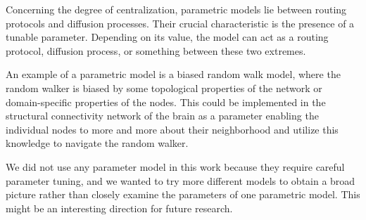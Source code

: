 Concerning the degree of centralization, parametric models lie between routing protocols and diffusion processes. Their crucial characteristic is the presence of a tunable parameter. Depending on its value, the model can act as a routing protocol, diffusion process, or something between these two extremes. \cite{seguin_brain_2023}

An example of a parametric model is a biased random walk model, where the random walker is biased by some topological properties of the network or domain-specific properties of the nodes. This could be implemented in the structural connectivity network of the brain as a parameter enabling the individual nodes to  more and more about their neighborhood and utilize this knowledge to navigate the random walker. \cite{seguin_brain_2023}

We did not use any parameter model in this work because they require careful parameter tuning, and we wanted to try more different models to obtain a broad picture rather than closely examine the parameters of one parametric model. This might be an interesting direction for future research.

